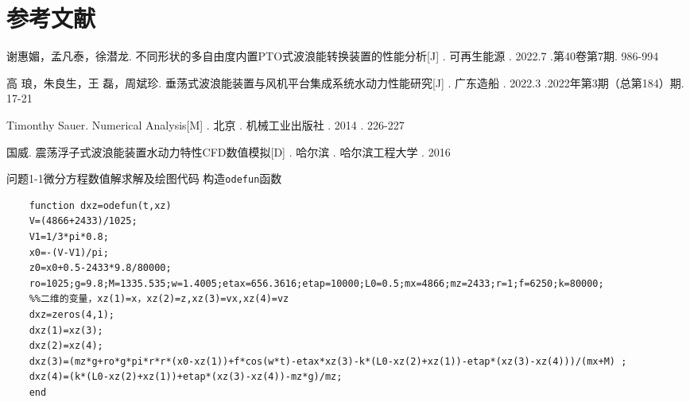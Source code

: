 \documentclass{article}
\numberwithin{equation}{subsection}
\begin{document}
{\centering\section{参考文献}}
\begingroup  %
\renewcommand{\section}[2]{}
\begin{thebibliography}{99}
    
谢惠媚，孟凡泰，徐潜龙. 不同形状的多自由度内置PTO式波浪能转换装置的性能分析[J] . 可再生能源 . 2022.7 .第40卷第7期. 986-994

高 琅，朱良生，王 磊，周斌珍. 垂荡式波浪能装置与风机平台集成系统水动力性能研究[J] . 广东造船 . 2022.3 .2022年第3期（总第184）期. 17-21

Timonthy Sauer. Numerical Analysis[M] . 北京 . 机械工业出版社 . 2014 . 226-227

国威. 震荡浮子式波浪能装置水动力特性CFD数值模拟[D] . 哈尔滨 . 哈尔滨工程大学 . 2016





\end{thebibliography}
\endgroup

\newpage



{\centering\section*{附录}}
\appendix
\section{问题一相关数据及代码}

\subsection{问题1-1微分方程数值解求解及绘图代码}
构造\verb|odefun|函数
\begin{lstlisting}
    function dxz=odefun(t,xz)
    V=(4866+2433)/1025; 
    V1=1/3*pi*0.8; 
    x0=-(V-V1)/pi;
    z0=x0+0.5-2433*9.8/80000;
    ro=1025;g=9.8;M=1335.535;w=1.4005;etax=656.3616;etap=10000;L0=0.5;mx=4866;mz=2433;r=1;f=6250;k=80000;
    %%二维的变量，xz(1)=x，xz(2)=z,xz(3)=vx,xz(4)=vz 
    dxz=zeros(4,1); 
    dxz(1)=xz(3); 
    dxz(2)=xz(4);
    dxz(3)=(mz*g+ro*g*pi*r*r*(x0-xz(1))+f*cos(w*t)-etax*xz(3)-k*(L0-xz(2)+xz(1))-etap*(xz(3)-xz(4)))/(mx+M) ;
    dxz(4)=(k*(L0-xz(2)+xz(1))+etap*(xz(3)-xz(4))-mz*g)/mz; 
    end
\end{lstlisting}
\end{document}
